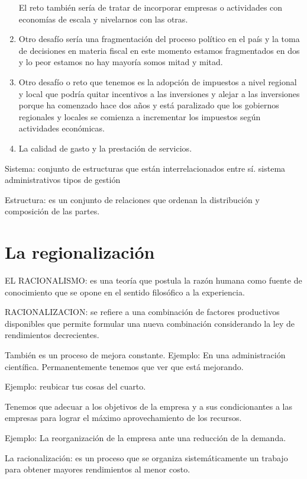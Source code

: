 \documentclass[
  a4paper,
]{article}
\begin{document}
\begin{enumerate}
  El reto también sería de tratar de incorporar empresas o actividades
  con economías de escala y nivelarnos con las otras.
\item
  Otro desafío sería una fragmentación del proceso político en el país y
  la toma de decisiones en materia fiscal en este momento estamos
  fragmentados en dos y lo peor estamos no hay mayoría somos mitad y
  mitad.
\item
  Otro desafío o reto que tenemos es la adopción de impuestos a nivel
  regional y local que podría quitar incentivos a las inversiones y
  alejar a las inversiones porque ha comenzado hace dos años y está
  paralizado que los gobiernos regionales y locales se comienza a
  incrementar los impuestos según actividades económicas.
\item
  La calidad de gasto y la prestación de servicios.
\end{enumerate}

Sistema: conjunto de estructuras que están interrelacionados entre sí.
sistema administrativos tipos de gestión

Estructura: es un conjunto de relaciones que ordenan la distribución y
composición de las partes.

\section{La regionalización}\label{la-regionalizaciuxf3n}

EL RACIONALISMO: es una teoría que postula la razón humana como fuente
de conocimiento que se opone en el sentido filosófico a la experiencia.

RACIONALIZACION: se refiere a una combinación de factores productivos
disponibles que permite formular una nueva combinación considerando la
ley de rendimientos decrecientes.

También es un proceso de mejora constante. Ejemplo: En una
administración científica. Permanentemente tenemos que ver que está
mejorando.

Ejemplo: reubicar tus cosas del cuarto.

Tenemos que adecuar a los objetivos de la empresa y a sus condicionantes
a las empresas para lograr el máximo aprovechamiento de los recursos.

Ejemplo: La reorganización de la empresa ante una reducción de la
demanda.

La racionalización: es un proceso que se organiza sistemáticamente un
trabajo para obtener mayores rendimientos al menor costo.
\end{document}

